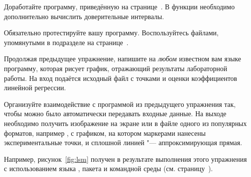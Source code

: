 \ExercisesSection
\begin{exercise}
\item Доработайте программу, приведённую на странице~\pageref{code:lsm}. В функции  необходимо дополнительно вычислить доверительные интервалы.

Обязательно протестируйте вашу программу. Воспользуйтесь файлами, упомянутыми в подразделе на странице~\pageref{test:lsm}.


\item\hard\label{ex:plot} Продолжая предыдущее упражнение, напишите на \emph{любом} известном вам языке программу, которая рисует график, отражающий результаты лабораторной работы. На вход подаётся исходный файл с точками и оценки коэффициентов линейной регрессии.

Организуйте взаимодействие с программой из предыдущего упражнения так, чтобы можно было автоматически передавать входные данные. На выходе необходимо получить изображение на экране или в файле одного из популярных форматов, например , с графиком, на котором маркерами нанесены экспериментальные точки, и сплошной линией "--- аппроксимирующая прямая.

Например, рисунок~\ref{fig:lsm} получен в результате выполнения этого упражнения с использованием языка , пакета  и командной среды (см. страницу~\pageref{sect:pyplot}).
\end{exercise}
